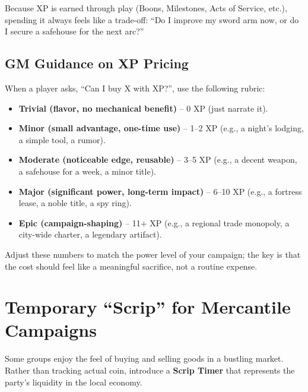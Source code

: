 Because XP is earned through play (Boons, Milestones, Acts of Service, etc.), spending it always feels like a trade-off: ``Do I improve my sword arm now, or do I secure a safehouse for the next arc?''

\subsection{GM Guidance on XP Pricing}
When a player asks, ``Can I buy X with XP?'', use the following rubric:

\begin{itemize}
  \item \textbf{Trivial (flavor, no mechanical benefit)} -- 0 XP (just narrate it).
  \item \textbf{Minor (small advantage, one-time use)} -- 1--2 XP (e.g., a night's lodging, a simple tool, a rumor).
  \item \textbf{Moderate (noticeable edge, reusable)} -- 3--5 XP (e.g., a decent weapon, a safehouse for a week, a minor title).
  \item \textbf{Major (significant power, long-term impact)} -- 6--10 XP (e.g., a fortress lease, a noble title, a spy ring).
  \item \textbf{Epic (campaign-shaping)} -- 11+ XP (e.g., a regional trade monopoly, a city-wide charter, a legendary artifact).
\end{itemize}

Adjust these numbers to match the power level of your campaign; the key is that the cost should feel like a meaningful sacrifice, not a routine expense.

\section{Temporary ``Scrip'' for Mercantile Campaigns}
Some groups enjoy the feel of buying and selling goods in a bustling market. Rather than tracking actual coin, introduce a \textbf{Scrip Timer} that represents the party's liquidity in the local economy.

